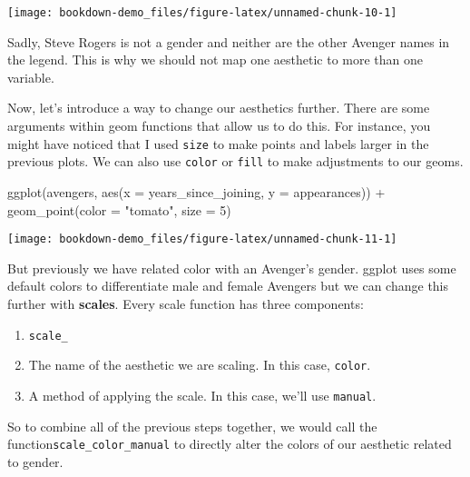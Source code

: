 \documentclass[
]{book}
\newenvironment{Shaded}{\begin{snugshade}}{\end{snugshade}}
\newcommand{\AttributeTok}[1]{\textcolor[rgb]{0.77,0.63,0.00}{#1}}
\newcommand{\DecValTok}[1]{\textcolor[rgb]{0.00,0.00,0.81}{#1}}
\newcommand{\FunctionTok}[1]{\textcolor[rgb]{0.00,0.00,0.00}{#1}}
\newcommand{\NormalTok}[1]{#1}
\newcommand{\SpecialCharTok}[1]{\textcolor[rgb]{0.00,0.00,0.00}{#1}}
\newcommand{\StringTok}[1]{\textcolor[rgb]{0.31,0.60,0.02}{#1}}
\providecommand{\tightlist}{%
  \setlength{\itemsep}{0pt}\setlength{\parskip}{0pt}}
\begin{document}
\begin{center}\texttt{[image: bookdown-demo\_files/figure-latex/unnamed-chunk-10-1]} \end{center}

Sadly, Steve Rogers is not a gender and neither are the other Avenger names in the legend. This is why we should not map one aesthetic to more than one variable.

Now, let's introduce a way to change our aesthetics further. There are some arguments within geom functions that allow us to do this. For instance, you might have noticed that I used \texttt{size} to make points and labels larger in the previous plots. We can also use \texttt{color} or \texttt{fill} to make adjustments to our geoms.

\begin{Shaded}
\begin{Highlighting}[]
\FunctionTok{ggplot}\NormalTok{(avengers, }\FunctionTok{aes}\NormalTok{(}\AttributeTok{x =}\NormalTok{ years\_since\_joining,}
                     \AttributeTok{y =}\NormalTok{ appearances)) }\SpecialCharTok{+}
  \FunctionTok{geom\_point}\NormalTok{(}\AttributeTok{color =} \StringTok{"tomato"}\NormalTok{, }\AttributeTok{size =} \DecValTok{5}\NormalTok{)}
\end{Highlighting}
\end{Shaded}

\begin{center}\texttt{[image: bookdown-demo\_files/figure-latex/unnamed-chunk-11-1]} \end{center}

But previously we have related color with an Avenger's gender. ggplot uses some default colors to differentiate male and female Avengers but we can change this further with \textbf{scales}. Every scale function has three components:

\begin{enumerate}
\def\labelenumi{\arabic{enumi}.}
\tightlist
\item
  \texttt{scale\_}
\item
  The name of the aesthetic we are scaling. In this case, \texttt{color}.
\item
  A method of applying the scale. In this case, we'll use \texttt{manual}.
\end{enumerate}

So to combine all of the previous steps together, we would call the function\texttt{scale\_color\_manual} to directly alter the colors of our aesthetic related to gender.
\end{document}
